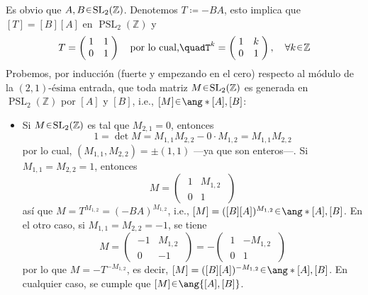 \begin{sol}[Demostración]
Es obvio que $A,B \en \operatorname{SL}_{2}(\mathbb{Z})$. Denotemos $T \coloneq -BA$, esto implica que $[T] = [B][A]$ en $\operatorname{PSL}_{2}(\mathbb{Z})$ y
\[
T = \left(\;\begin{matrix}1 & 1 \\ 0 & 1\end{matrix}\;\right)%
\quad\text{por lo cual,}\quad%
T^k = \left(\;\begin{matrix}1 & k \\ 0 & 1\end{matrix}\;\right),
\quad%
\forall k \en \mathbb{Z}
\]
Probemos, por inducción (fuerte y empezando en el cero) respecto al módulo de la $(2,1)\text{-ésima}$ entrada, que toda matriz $M \en \operatorname{SL}_{2}(\mathbb{Z})$ es generada en $\operatorname{PSL}_{2}(\mathbb{Z})$ por $[A]$ y $[B]$, i.e., $[M] \en \ang*{[A],[B]}$:
\begin{itemize}
\item Si $M \en \operatorname{SL}_{2}(\mathbb{Z})$ es tal que $M_{2,1} = 0$, entonces 
\[
1 = \det M = M_{1,1}M_{2,2} - 0\cdot M_{1,2} = M_{1,1}M_{2,2}
\]
por lo cual, $(M_{1,1},M_{2,2}) = \pm(1,1)$ ---ya que son enteros---. Si $M_{1,1} = M_{2,2} = 1$, entonces 
\[
M =\left(\;
    \begin{matrix}
    1 & M_{1,2} \\
    0 & 1
    \end{matrix}
\;\right)
\]
así que $M = T^{M_{1,2}} = (-BA)^{M_{1,2}}$, i.e., $[M] = ([B][A])^{M_{1,2}} \en \ang*{[A],[B]}$. En el otro caso, si $M_{1,1} = M_{2,2} = -1$, se tiene
\[
M =%
\left(\;
    \begin{matrix}
    -1 & M_{1,2} \\
    0 & -1
    \end{matrix}
\;\right)%
= -
\left(\;
    \begin{matrix}
    1 & -M_{1,2} \\
    0 & 1
    \end{matrix}
\;\right)
\]
por lo que $M = -T^{-M_{1,2}}$, es decir, $[M] = ([B][A])^{-M_{1,2}} \en \ang*{[A],[B]}$. En cualquier caso, se cumple que $[M] \en \ang{[A],[B]}$.


\end{itemize}
\end{sol}

